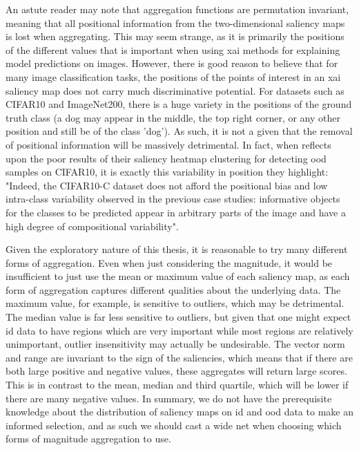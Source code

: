 \documentclass[UKenglish]{uiomasterthesis} %
\theoremstyle{definition}
\begin{document}
An astute reader may note that aggregation functions are permutation invariant, meaning that all positional information from the two-dimensional saliency maps is lost when aggregating. This may seem strange, as it is primarily the positions of the different values that is important when using \ac{xai} methods for explaining model predictions on images. However, there is good reason to believe that for many image classification tasks, the positions of the points of interest in an \ac{xai} saliency map does not carry much discriminative potential. For datasets such as CIFAR10 and ImageNet200, there is a huge variety in the positions of the ground truth class (a dog may appear in the middle, the top right corner, or any other position and still be of the class 'dog'). As such, it is not a given that the removal of positional information will be massively detrimental. In fact, when \cite{martinez} reflects upon the poor results of their saliency heatmap clustering for detecting \ac{ood} samples on CIFAR10, it is exactly this variability in position they highlight: "Indeed, the CIFAR10-C dataset does not afford the positional bias and low intra-class variability observed in the previous case studies: informative objects for the classes to be predicted appear in arbitrary parts of the image and have a high degree of compositional variability".

Given the exploratory nature of this thesis, it is reasonable to try many different forms of aggregation. Even when just considering the magnitude, it would be insufficient to just use the mean or maximum value of each saliency map, as each form of aggregation captures different qualities about the underlying data. The maximum value, for example, is sensitive to outliers, which may be detrimental. The median value is far less sensitive to outliers, but given that one might expect \ac{id} data to have regions which are very important while most regions are relatively unimportant, outlier insensitivity may actually be undesirable. The vector norm and range are invariant to the sign of the saliencies, which means that if there are both large positive and negative values, these aggregates will return large scores. This is in contrast to the mean, median and third quartile, which will be lower if there are many negative values. In summary, we do not have the prerequisite knowledge about the distribution of saliency maps on \ac{id} and \ac{ood} data to make an informed selection, and as such we should cast a wide net when choosing which forms of magnitude aggregation to use.
\end{document}
